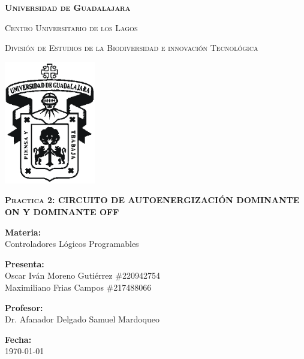 \documentclass[12pt]{report}
\begin{document}
\setlength{\hoffset}{27 pt} %
\begin{titlepage}
{\centering
{\scshape\bfseries\fontsize{29.16}{34.992}\selectfont Universidad de Guadalajara \par}
\vspace{0.5cm}
{\scshape\Large Centro Universitario de los Lagos \par}
\vspace{1cm}
{\scshape\Large División de Estudios de la Biodiversidad e innovación Tecnológica \par}
\vspace{1cm}
{\graphicspath{{imagenes/Portada}} %
\includegraphics[width=0.3\textwidth]{image.png}\par}
\vspace{1cm}
{\scshape\large\bfseries Practica 2: CIRCUITO DE AUTOENERGIZACIÓN
DOMINANTE ON Y DOMINANTE OFF \par}
\vspace{0.5cm}
{\large \textbf{Materia:} \\Controladores Lógicos Programables\par}
\vfill
{\large \textbf{Presenta:} \\Oscar Iván Moreno Gutiérrez \#220942754
\\Maximiliano Frias Campos \#217488066
\par}
\vfill
{\large \textbf{Profesor:} \\Dr. Afanador Delgado Samuel Mardoqueo \par}
\vfill
\vfill
\begin{flushright}
  {\normalsize \textbf {Fecha:} \\ \today}
\end{flushright}
\vfill}
{\large  \par}
\end{titlepage}
\end{document}

